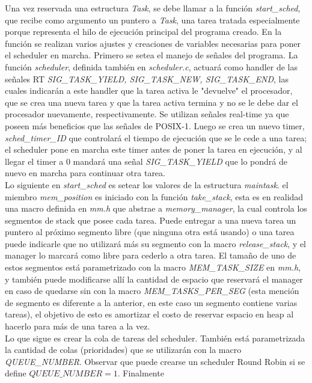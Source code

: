 \documentclass[a4paper]{article}
\begin{document}
Una vez reservada una estructura \textit{Task}, se debe llamar a la
función \textit{start\_sched}, que recibe como argumento un puntero
a \textit{Task}, una tarea tratada especialmente porque representa
el hilo de ejecución principal del programa creado. En la función
se realizan varios ajustes y creaciones de variables necesarias
para poner el scheduler en marcha. Primero se setea el manejo de
señales del programa. La función \textit{scheduler},
definida también en \textit{scheduler.c}, actuará como handler de
las señales RT \textit{SIG\_TASK\_YIELD, SIG\_TASK\_NEW, SIG\_TASK\_END},
las cuales indicarán a este handler que la tarea activa le "devuelve"
el procesador, que se crea una nueva tarea y que la tarea activa
termina y no se le debe dar el procesador nuevamente, respectivamente.
Se utilizan señales real-time ya que poseen más beneficios que las
señales de POSIX-1. Luego se crea un nuevo timer,
\textit{sched\_timer\_ID} que controlará el tiempo de ejecución que se
le cede a una tarea; el scheduler pone en marcha este timer antes
de poner la tarea en ejecución, y al llegar el timer a 0 mandará
una señal \textit{SIG\_TASK\_YIELD} que lo pondrá de nuevo en marcha
para continuar otra tarea. \\
Lo siguiente en \textit{start\_sched} es setear los valores de la
estructura \textit{maintask}. el miembro \textit{mem\_position} es
iniciado con la función \textit{take\_stack}, esta es en realidad una
macro definida en \textit{mm.h} que abstrae a \textit{memory\_manager},
la cual controla los segmentos de stack que posee cada tarea. Puede
entregar a una nueva tarea un puntero al próximo segmento libre (que
ninguna otra está usando) o una tarea puede indicarle que no utilizará
más su segmento con la macro \textit{release\_stack}, y el manager lo
marcará como libre para cederlo a otra tarea. El tamaño de uno de
estos segmentos está parametrizado con la macro \textit{MEM\_TASK\_SIZE}
en \textit{mm.h}, y también puede modificarse allí la cantidad de
espacio que reservará el manager en caso de quedarse sin con la
macro \textit{MEM\_TASKS\_PER\_SEG} (esta mención de segmento es
diferente a la anterior, en este caso un segmento contiene varias
tareas), el objetivo de esto es amortizar el costo de reservar espacio
en heap al hacerlo para más de una tarea a la vez. \\
Lo que sigue es crear la cola de tareas del scheduler. También está
parametrizada la cantidad de colas (prioridades) que se utilizarán
con la macro \textit{QUEUE\_NUMBER}. Observar que puede crearse un
scheduler Round Robin si se define $QUEUE\_NUMBER = 1$. Finalmente
\end{document}
